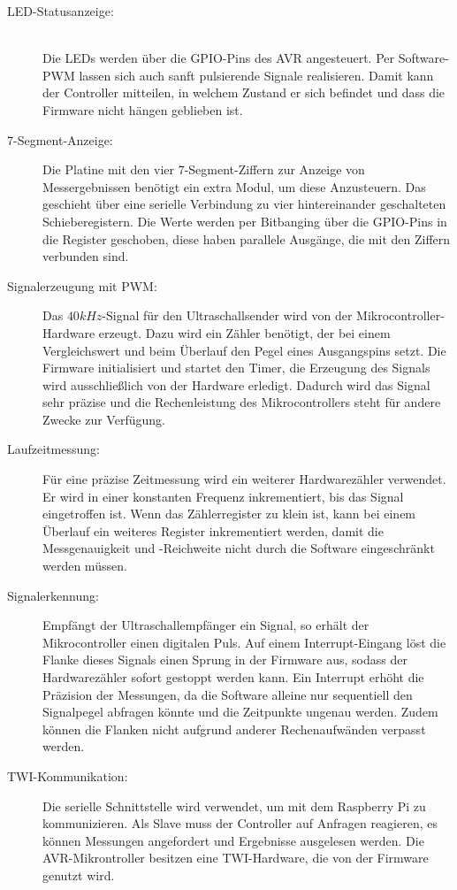 \begin{description} %
	\item[LED-Statusanzeige:] \hfill \\Die LEDs werden über die \ac{GPIO}-Pins des AVR angesteuert. Per Software-\ac{PWM} lassen sich auch sanft pulsierende Signale realisieren. Damit kann der Controller mitteilen, in welchem Zustand er sich befindet und dass die Firmware nicht hängen geblieben ist.
	\item[7-Segment-Anzeige:] Die Platine mit den vier 7-Segment-Ziffern zur Anzeige von Messergebnissen benötigt ein extra Modul, um diese Anzusteuern. Das geschieht über eine serielle Verbindung zu vier hintereinander geschalteten Schieberegistern. Die Werte werden per \ac{Bitbanging} über die \ac{GPIO}-Pins in die Register geschoben, diese haben parallele Ausgänge, die mit den Ziffern verbunden sind.
	\item[Signalerzeugung mit \ac{PWM}:] Das $40kHz$-Signal für den Ultraschallsender wird von der Mikrocontroller-Hardware erzeugt. Dazu wird ein Zähler benötigt, der bei einem Vergleichswert und beim Überlauf den Pegel eines Ausgangspins setzt. Die Firmware initialisiert und startet den Timer, die Erzeugung des Signals wird ausschließlich von der Hardware erledigt. Dadurch wird das Signal sehr präzise und die Rechenleistung des Mikrocontrollers steht für andere Zwecke zur Verfügung.
	\item[Laufzeitmessung:] Für eine präzise Zeitmessung wird ein weiterer Hardwarezähler verwendet. Er wird in einer konstanten Frequenz inkrementiert, bis das Signal eingetroffen ist. Wenn das Zählerregister zu klein ist, kann bei einem Überlauf ein weiteres Register inkrementiert werden, damit die Messgenauigkeit und -Reichweite nicht durch die Software eingeschränkt werden müssen.
	\item[Signalerkennung:] Empfängt der Ultraschallempfänger ein Signal, so erhält der Mikrocontroller einen digitalen Puls. Auf einem Interrupt-Eingang löst die Flanke dieses Signals einen Sprung in der Firmware aus, sodass der Hardwarezähler sofort gestoppt werden kann. Ein Interrupt erhöht die Präzision der Messungen, da die Software alleine nur sequentiell den Signalpegel abfragen könnte und die Zeitpunkte ungenau werden. Zudem können die Flanken nicht aufgrund anderer Rechenaufwänden verpasst werden.
	\item[\ac{TWI}-Kommunikation:] Die serielle Schnittstelle wird verwendet, um mit dem Raspberry Pi zu kommunizieren. Als Slave muss der Controller auf Anfragen reagieren, es können Messungen angefordert und Ergebnisse ausgelesen werden. Die AVR-Mikrontroller besitzen eine \ac{TWI}-Hardware, die von der Firmware genutzt wird.
\end{description}


